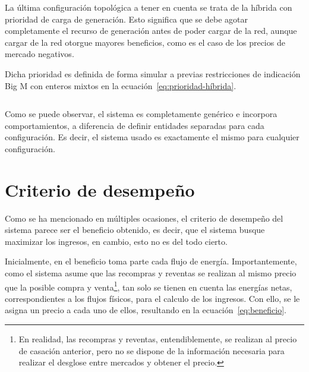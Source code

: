 \begin{equation}
  \label{eq:clipping}
\end{equation}

La última configuración topológica a tener en cuenta se trata de la híbrida con prioridad de carga de generación. Esto significa que se debe agotar completamente el recurso de generación antes de poder cargar de la red, aunque cargar de la red otorgue mayores beneficios, como es el caso de los precios de mercado negativos.

Dicha prioridad es definida de forma simular a previas restricciones de indicación Big M con enteros mixtos en la ecuación~\ref{eq:prioridad-híbrida}.

\begin{equation}
  \label{eq:prioridad-híbrida}
\end{equation}

Como se puede observar, el sistema es completamente genérico e incorpora comportamientos, a diferencia de definir entidades separadas para cada configuración. Es decir, el sistema usado es exactamente el mismo para cualquier configuración.

\section{Criterio de desempeño}
\label{makereference5.3}

Como se ha mencionado en múltiples ocasiones, el criterio de desempeño del sistema parece ser el beneficio obtenido, es decir, que el sistema busque maximizar los ingresos, en cambio, esto no es del todo cierto.

Inicialmente, en el beneficio toma parte cada flujo de energía. Importantemente, como el sistema asume que las recompras y reventas se realizan al mismo precio que la posible compra y venta\footnote{En realidad, las recompras y reventas, entendiblemente, se realizan al precio de casación anterior, pero no se dispone de la información necesaria para realizar el desglose entre mercados y obtener el precio.}, tan solo se tienen en cuenta las energías netas, correspondientes a los flujos físicos, para el calculo de los ingresos. Con ello, se le asigna un precio a cada uno de ellos, resultando en la ecuación~\ref{eq:beneficio}.

